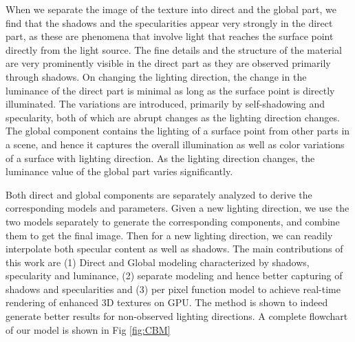 When we separate the image of the texture into direct and the global part, we find
that the shadows and the specularities appear very strongly in the direct part,
as these are phenomena that involve light that reaches the surface point
directly from the light source. The fine details and the structure of the
material are very prominently visible in the direct part as they are observed
primarily through shadows. On changing the lighting direction, the change in the
luminance of the direct part is minimal as long as the surface point is directly
illuminated. The variations are introduced, primarily by self-shadowing and
specularity, both of which are abrupt changes as the lighting direction changes.
The global component contains the lighting of a surface point from other
parts in a scene, and hence it captures the overall illumination as well as
color variations of a surface with lighting direction. As the lighting direction
changes, the luminance value of the global part varies significantly.

Both direct and global components are separately analyzed to derive the
corresponding models and parameters. Given a new lighting direction, we use the
two models separately to generate the corresponding components, and combine them
to get the final image. Then for a new lighting direction, we can readily
interpolate both specular content as well as shadows.
The main contributions of this work are (1) Direct and Global modeling characterized by
shadows, specularity and luminance, 
(2) separate modeling and hence better capturing of shadows and specularities 
and (3) per pixel function model to
achieve real-time rendering of enhanced 3D textures on GPU.
The method is shown to indeed
generate better results for non-observed lighting directions.
A complete flowchart of our model is shown in Fig \ref{fig:CBM}


